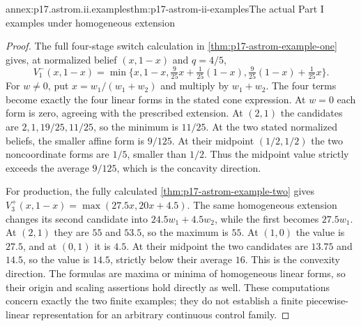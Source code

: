\begin{annexitem}{annex:p17.astrom.ii.examples}{thm:p17-astrom-ii-examples}{The actual Part I examples under homogeneous extension}
\begin{proof}
The full four-stage switch calculation in
\cref{thm:p17-astrom-example-one} gives, at
normalized belief \((x,1-x)\) and \(q=4/5\),
\[
 V_1^-(x,1-x)=
 \min\{x,1-x,\tfrac9{25}x+\tfrac1{25}(1-x),
                         \tfrac9{25}(1-x)+\tfrac1{25}x\}.
\]
For \(w\ne0\), put \(x=w_1/(w_1+w_2)\)
and multiply by \(w_1+w_2\).
The four terms become exactly the four linear
forms in the stated cone expression. At
\(w=0\) each form is zero, agreeing with
the prescribed extension.
At \((2,1)\) the candidates are
\(2,1,19/25,11/25\), so the minimum is \(11/25\).
At the two stated normalized beliefs, the
smaller affine form is \(9/125\).
At their midpoint \((1/2,1/2)\) the two
noncoordinate forms are \(1/5\), smaller
than \(1/2\). Thus the midpoint value
strictly exceeds the average \(9/125\),
which is the concavity direction.

For production, the fully calculated
\cref{thm:p17-astrom-example-two} gives
\(V_3^+(x,1-x)=\max(27.5x,20x+4.5)\).
The same homogeneous extension changes its
second candidate into
\(24.5w_1+4.5w_2\), while the first becomes
\(27.5w_1\). At \((2,1)\) they are
\(55\) and \(53.5\), so the maximum is \(55\).
At \((1,0)\) the value is \(27.5\), and
at \((0,1)\) it is \(4.5\).
At their midpoint the two candidates are
\(13.75\) and \(14.5\), so the value is
\(14.5\), strictly below their average \(16\).
This is the convexity direction.
The formulas are maxima or minima of
homogeneous linear forms, so their origin
and scaling assertions hold directly as well.
These computations concern exactly the two
finite examples; they do not establish a
finite piecewise-linear representation for
an arbitrary continuous control family.
\end{proof}
\end{annexitem}

